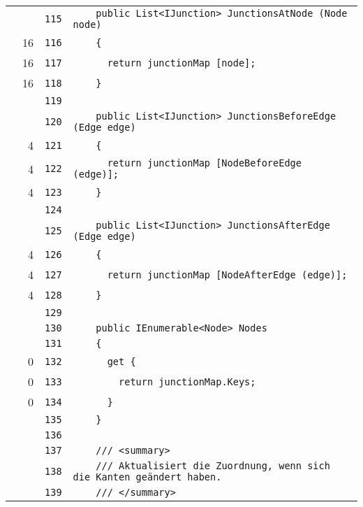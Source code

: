 \documentclass[a4paper,10pt]{article}
\begin{document}
\begin{longtable}[l]{lrrl}
\cellcolor{gray} &  & \verb~115~ & \verb~    public List<IJunction> JunctionsAtNode (Node node)~\\
\cellcolor{green} & 16 & \verb~116~ & \verb~    {~\\
\cellcolor{green} & 16 & \verb~117~ & \verb~      return junctionMap [node];~\\
\cellcolor{green} & 16 & \verb~118~ & \verb~    }~\\
\cellcolor{gray} &  & \verb~119~ & \verb~~\\
\cellcolor{gray} &  & \verb~120~ & \verb~    public List<IJunction> JunctionsBeforeEdge (Edge edge)~\\
\cellcolor{green} & 4 & \verb~121~ & \verb~    {~\\
\cellcolor{green} & 4 & \verb~122~ & \verb~      return junctionMap [NodeBeforeEdge (edge)];~\\
\cellcolor{green} & 4 & \verb~123~ & \verb~    }~\\
\cellcolor{gray} &  & \verb~124~ & \verb~~\\
\cellcolor{gray} &  & \verb~125~ & \verb~    public List<IJunction> JunctionsAfterEdge (Edge edge)~\\
\cellcolor{green} & 4 & \verb~126~ & \verb~    {~\\
\cellcolor{green} & 4 & \verb~127~ & \verb~      return junctionMap [NodeAfterEdge (edge)];~\\
\cellcolor{green} & 4 & \verb~128~ & \verb~    }~\\
\cellcolor{gray} &  & \verb~129~ & \verb~~\\
\cellcolor{gray} &  & \verb~130~ & \verb~    public IEnumerable<Node> Nodes~\\
\cellcolor{gray} &  & \verb~131~ & \verb~    {~\\
\cellcolor{red} & 0 & \verb~132~ & \verb~      get {~\\
\cellcolor{red} & 0 & \verb~133~ & \verb~        return junctionMap.Keys;~\\
\cellcolor{red} & 0 & \verb~134~ & \verb~      }~\\
\cellcolor{gray} &  & \verb~135~ & \verb~    }~\\
\cellcolor{gray} &  & \verb~136~ & \verb~~\\
\cellcolor{gray} &  & \verb~137~ & \verb~    /// <summary>~\\
\cellcolor{gray} &  & \verb~138~ & \verb~    /// Aktualisiert die Zuordnung, wenn sich die Kanten geändert haben.~\\
\cellcolor{gray} &  & \verb~139~ & \verb~    /// </summary>~\\

\end{longtable}
\end{document}
